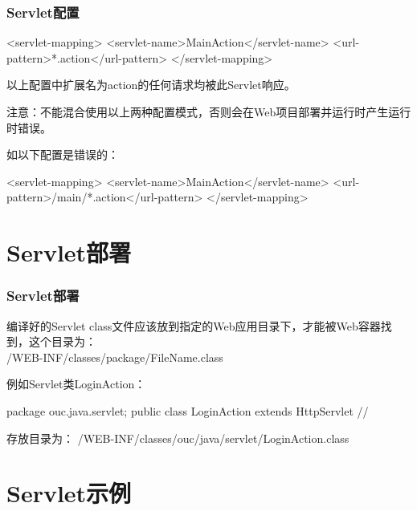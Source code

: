 \begin{frame}[fragile] %
\frametitle{Servlet配置}

\begin{xmlCode}
<servlet-mapping>
  <servlet-name>MainAction</servlet-name>
  <url-pattern>*.action</url-pattern>
</servlet-mapping>
\end{xmlCode}

以上配置中扩展名为action的任何请求均被此Servlet响应。

{\Red\kai 注意：不能混合使用以上两种配置模式，否则会在Web项目部署并运行时产生运行时错误。}

如以下配置是错误的：

\begin{xmlCode}
<servlet-mapping>
  <servlet-name>MainAction</servlet-name>
  <url-pattern>/main/*.action</url-pattern>
</servlet-mapping>
\end{xmlCode}
\end{frame}

\section{Servlet部署}

\begin{frame}[fragile] %
\frametitle{Servlet部署}

编译好的Servlet class文件应该放到指定的Web应用目录下，才能被Web容器找到，这个目录为：\\
{\Red /WEB-INF/classes/package/FileName.class}

例如Servlet类LoginAction：
\begin{javaCode}
package ouc.java.servlet;
public class LoginAction extends HttpServlet {
  //     
}
\end{javaCode}

存放目录为：
{\Blue /WEB-INF/classes/ouc/java/servlet/LoginAction.class}
\end{frame}

\section{Servlet示例} 

